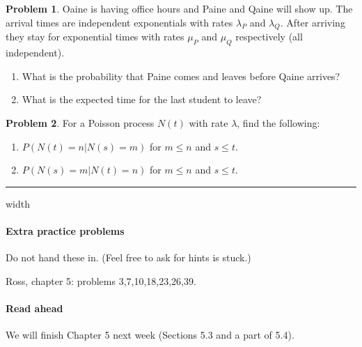 \documentclass{article}
\theoremstyle{definition}
\newtheorem{problem}{Problem}
\begin{document}

\begin{problem}
  Oaine is having office hours and Paine and Qaine will show up.
  The arrival times are independent exponentials with rates $\lambda_P$ and $\lambda_Q$.
  After arriving they stay for exponential times with rates $\mu_P$ and $\mu_Q$ respectively (all independent).
  \begin{enumerate}
  \item What is the probability that Paine comes and leaves before Qaine arrives?
  \item What is the expected time for the last student to leave?
  \end{enumerate}
\end{problem}


\begin{problem}
  For a Poisson process $N(t)$ with rate $\lambda$, find the following:
  \begin{enumerate}
  \item $P(N(t)=n | N(s)=m)$ for $m\le n$ and $s\le t$.
  \item $P(N(s)=m | N(t)=n)$ for $m\le n$ and $s\le t$.
  \end{enumerate}
\end{problem}


\hrule width \textwidth

\paragraph{Extra practice problems}
Do not hand these in. (Feel free to ask for hints is stuck.)

Ross, chapter 5: problems 3,7,10,18,23,26,39.

\paragraph{Read ahead}
We will finish Chapter 5 next week (Sections 5.3 and a part of 5.4).
\end{document}
